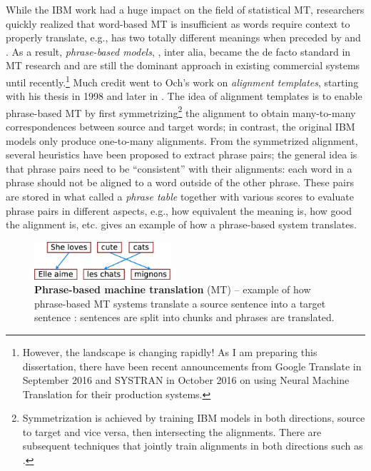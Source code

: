 While the IBM work had a huge impact on the field of statistical MT, researchers
quickly realized that word-based MT is insufficient as words
require context to properly translate, e.g.,  has two totally different
meanings when preceded by  and . As a result,
{\it phrase-based models}, \cite{Marcu:2002,Zens2002,Koehn:2003:SMT}, inter alia, became the de facto
standard in MT research and are still the dominant approach in existing
commercial systems until recently.\footnote{However, the landscape is changing rapidly! As I am preparing this dissertation, there have been recent announcements from Google Translate \cite{gnmt16} in September 2016 and SYSTRAN \cite{systran16} in October 2016 on using Neural Machine Translation for their production systems.} Much credit went to Och's
work on {\it alignment templates}, starting with his thesis in 1998 and later in
\cite{och03,och04}. The idea of alignment templates is to enable phrase-based MT
by first symmetrizing\footnote{Symmetrization is achieved by training IBM models
in both directions, source to target and vice versa, then intersecting the
alignments. There are subsequent techniques that jointly train alignments in
both directions such as \cite{liang06alignment}.} the alignment to obtain many-to-many correspondences
between source and target words; in contrast, the original IBM models only produce
one-to-many alignments. From the symmetrized alignment, several heuristics have
been proposed to extract phrase pairs; the general idea is that phrase
pairs need to be ``consistent'' with their alignments: each word in a phrase
should not be aligned to a word outside of the other phrase. These pairs are stored
in what called a {\it phrase table} together with various scores to evaluate
phrase pairs in different aspects, e.g., how equivalent the meaning is, how good
the alignment is, etc.  gives an example of how a
phrase-based system translates.

\begin{figure}[tbh!]
\centering
\includegraphics[width=0.45\textwidth, clip=true, trim= 0 0 0
0]{img/phrasemt.eps}
\caption[Phrase-based machine translation]{{\bf Phrase-based machine translation} (MT) -- example of how phrase-based
MT systems translate a source sentence  into a target sentence
: sentences are split into chunks and phrases
are translated.
} 
\label{f:phrase_mt}
\end{figure}

